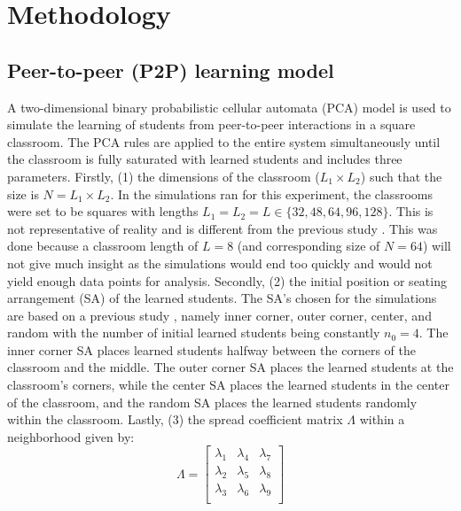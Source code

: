 \documentclass[10pt,a4paper,twoside]{article}
\begin{document}
\section{Methodology}\label{sec:methods}
\subsection{Peer-to-peer (P2P) learning model}
A two-dimensional binary probabilistic cellular automata (PCA) model is used to simulate the learning of students from peer-to-peer interactions in a square classroom. The PCA rules are applied to the entire system simultaneously until the classroom is fully saturated with learned students and includes three parameters. Firstly, (1) the dimensions of the classroom ($L_1 \times L_2$) such that the size is $N=L_1 \times L_2$. In the simulations ran for this experiment, the classrooms were set to be squares with lengths $L_1 = L_2 = L \in \lbrace 32,48,64,96,128\rbrace$. This is not representative of reality and is different from the previous study \cite{roxas2010seating}. This was done because a classroom length of $L=8$ (and corresponding size of $N=64$) will not give much insight as the simulations would end too quickly and would not yield enough data points for analysis. Secondly, (2) the initial position or seating arrangement (SA) of the learned students. The SA's chosen for the simulations are based on a previous study \cite{roxas2010seating}, namely inner corner, outer corner, center, and random with the number of initial learned students being constantly $n_0 = 4$. The inner corner SA places learned students halfway between the corners of the classroom and the middle. The outer corner SA places the learned students at the classroom's corners, while the center SA places the learned students in the center of the classroom, and the random SA places the learned students randomly within the classroom. Lastly, (3) the spread coefficient matrix $\Lambda$ within a neighborhood given by:
\begin{equation}\label{eq:Lambda matrix}
  \Lambda = 
  \begin{bmatrix}
  \lambda_1 & \lambda_4 & \lambda_7\\
  \lambda_2 & \lambda_5 & \lambda_8\\
  \lambda_3 & \lambda_6 & \lambda_9\\
  \end{bmatrix}%
\end{equation}
\end{document}
